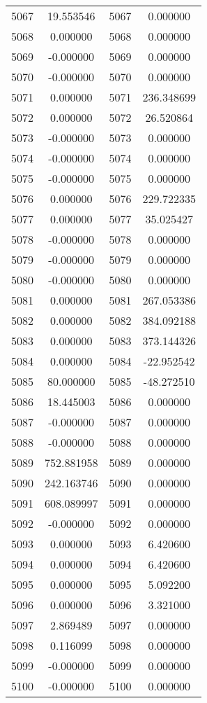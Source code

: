 \documentclass[12pt]{article}
\begin{document}
\begin{longtable}{@{}cccc@{}}
5067 & 19.553546 & 5067 & 0.000000 \\
5068 & 0.000000 & 5068 & 0.000000 \\
5069 & -0.000000 & 5069 & 0.000000 \\
5070 & -0.000000 & 5070 & 0.000000 \\
5071 & 0.000000 & 5071 & 236.348699 \\
5072 & 0.000000 & 5072 & 26.520864 \\
5073 & -0.000000 & 5073 & 0.000000 \\
5074 & -0.000000 & 5074 & 0.000000 \\
5075 & -0.000000 & 5075 & 0.000000 \\
5076 & 0.000000 & 5076 & 229.722335 \\
5077 & 0.000000 & 5077 & 35.025427 \\
5078 & -0.000000 & 5078 & 0.000000 \\
5079 & -0.000000 & 5079 & 0.000000 \\
5080 & -0.000000 & 5080 & 0.000000 \\
5081 & 0.000000 & 5081 & 267.053386 \\
5082 & 0.000000 & 5082 & 384.092188 \\
5083 & 0.000000 & 5083 & 373.144326 \\
5084 & 0.000000 & 5084 & -22.952542 \\
5085 & 80.000000 & 5085 & -48.272510 \\
5086 & 18.445003 & 5086 & 0.000000 \\
5087 & -0.000000 & 5087 & 0.000000 \\
5088 & -0.000000 & 5088 & 0.000000 \\
5089 & 752.881958 & 5089 & 0.000000 \\
5090 & 242.163746 & 5090 & 0.000000 \\
5091 & 608.089997 & 5091 & 0.000000 \\
5092 & -0.000000 & 5092 & 0.000000 \\
5093 & 0.000000 & 5093 & 6.420600 \\
5094 & 0.000000 & 5094 & 6.420600 \\
5095 & 0.000000 & 5095 & 5.092200 \\
5096 & 0.000000 & 5096 & 3.321000 \\
5097 & 2.869489 & 5097 & 0.000000 \\
5098 & 0.116099 & 5098 & 0.000000 \\
5099 & -0.000000 & 5099 & 0.000000 \\
5100 & -0.000000 & 5100 & 0.000000 \\

\end{longtable}
\end{document}
